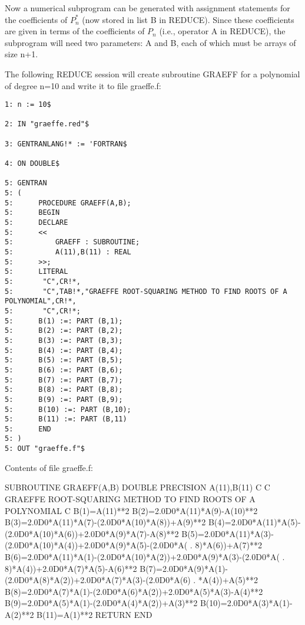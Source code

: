 Now a numerical subprogram can be generated with assignment
statements for the coefficients of $P^{*}_n$ (now stored in list B in
REDUCE).  Since these coefficients are given in terms of the coefficients
of $P_n$ (i.e., operator A in REDUCE), the subprogram will need two
parameters:  A and B, each of which must be arrays of size n+1.

The following REDUCE session will create subroutine GRAEFF for a polynomial
of degree n=10 and write it to file graeffe.f:
\begin{verbatim}
1: n := 10$ 

2: IN "graeffe.red"$

3: GENTRANLANG!* := 'FORTRAN$ 

4: ON DOUBLE$

5: GENTRAN 
5: ( 
5:      PROCEDURE GRAEFF(A,B); 
5:      BEGIN 
5:      DECLARE 
5:      << 
5:          GRAEFF : SUBROUTINE; 
5:          A(11),B(11) : REAL
5:      >>; 
5:      LITERAL 
5:       "C",CR!*, 
5:       "C",TAB!*,"GRAEFFE ROOT-SQUARING METHOD TO FIND ROOTS OF A POLYNOMIAL",CR!*, 
5:       "C",CR!*; 
5:      B(1) :=: PART (B,1);
5:      B(2) :=: PART (B,2);
5:      B(3) :=: PART (B,3);
5:      B(4) :=: PART (B,4);
5:      B(5) :=: PART (B,5);
5:      B(6) :=: PART (B,6);
5:      B(7) :=: PART (B,7);
5:      B(8) :=: PART (B,8);
5:      B(9) :=: PART (B,9);
5:      B(10) :=: PART (B,10);
5:      B(11) :=: PART (B,11)
5:      END 
5: ) 
5: OUT "graeffe.f"$ 
\end{verbatim}
Contents of file graeffe.f:
\begin{framedverbatim}
      SUBROUTINE GRAEFF(A,B)
      DOUBLE PRECISION A(11),B(11)
C
C     GRAEFFE ROOT-SQUARING METHOD TO FIND ROOTS OF A POLYNOMIAL
C
      B(1)=A(11)**2
      B(2)=2.0D0*A(11)*A(9)-A(10)**2
      B(3)=2.0D0*A(11)*A(7)-(2.0D0*A(10)*A(8))+A(9)**2
      B(4)=2.0D0*A(11)*A(5)-(2.0D0*A(10)*A(6))+2.0D0*A(9)*A(7)-A(8)**2
      B(5)=2.0D0*A(11)*A(3)-(2.0D0*A(10)*A(4))+2.0D0*A(9)*A(5)-(2.0D0*A(
     . 8)*A(6))+A(7)**2
      B(6)=2.0D0*A(11)*A(1)-(2.0D0*A(10)*A(2))+2.0D0*A(9)*A(3)-(2.0D0*A(
     . 8)*A(4))+2.0D0*A(7)*A(5)-A(6)**2
      B(7)=2.0D0*A(9)*A(1)-(2.0D0*A(8)*A(2))+2.0D0*A(7)*A(3)-(2.0D0*A(6)
     . *A(4))+A(5)**2
      B(8)=2.0D0*A(7)*A(1)-(2.0D0*A(6)*A(2))+2.0D0*A(5)*A(3)-A(4)**2
      B(9)=2.0D0*A(5)*A(1)-(2.0D0*A(4)*A(2))+A(3)**2
      B(10)=2.0D0*A(3)*A(1)-A(2)**2
      B(11)=A(1)**2
      RETURN
      END
\end{framedverbatim}

